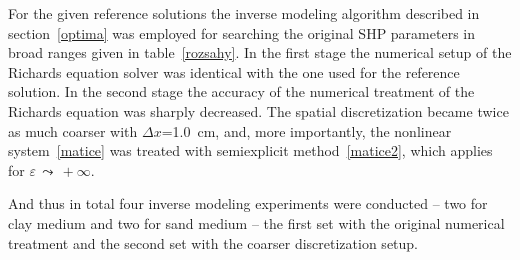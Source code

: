 \documentclass[review]{elsarticle}
\begin{document}
For the given reference solutions the inverse modeling algorithm described in section~\ref{optima} was employed for searching the original SHP parameters in broad ranges given in table~\ref{rozsahy}. In the first stage the numerical setup of the Richards equation solver was identical with the one used for the reference solution. In the second stage the accuracy of the numerical treatment  of the Richards equation was sharply decreased. The spatial discretization became twice as much coarser with $\Delta x$=1.0~cm, and, more importantly, the nonlinear system~\eqref{matice} was treated  with semiexplicit method~\eqref{matice2}, which applies for $\varepsilon \, \leadsto \, +\infty$. 
 
And thus in total four inverse modeling experiments were conducted -- two for clay medium and two for sand medium -- the first set with the original numerical treatment and the second set with the coarser discretization setup.
\end{document}
